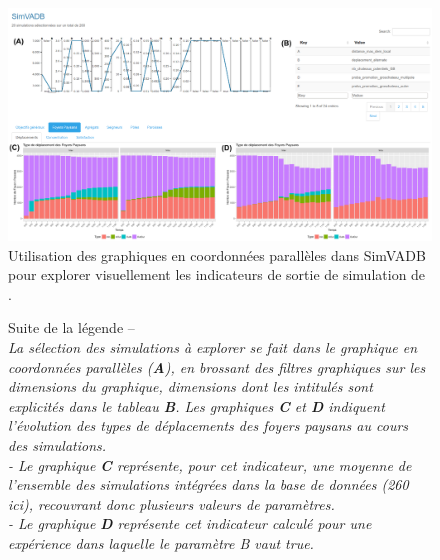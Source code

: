 \begin{figure}[H]
	\centering
	\captionsetup{width=\linewidth}
	\includegraphics[height=.88\linewidth,angle=90]{img/SimVADB_Dashboard2_annote_retouche.png}
	\caption[Utilisation des graphiques en coordonnées parallèles dans SimVADB pour explorer visuellement les indicateurs de sortie de simulation de \simfeodal{}.]{Utilisation des graphiques en coordonnées parallèles dans SimVADB pour explorer visuellement les indicateurs de sortie de simulation de \simfeodal{}.}
	\label{fig:simvadb_dashboard}
\end{figure}
\clearpage

\addtocounter{figure}{-1}
\begin{figure}[H]
	\vspace*{2em}\caption[exemple]{Suite de la légende --\\
\textit{La sélection des simulations à explorer se fait dans le graphique en coordonnées parallèles (\textbf{A}), en \og brossant\fg{} des filtres graphiques sur les \og dimensions\fg{} du graphique, dimensions dont les intitulés sont explicités dans le tableau \textbf{B}.	Les graphiques \textbf{C} et \textbf{D} indiquent l'évolution des types de déplacements des foyers paysans au cours des simulations.\\
- Le graphique \textbf{C} représente, pour cet indicateur, une moyenne de l'ensemble des simulations intégrées dans la base de données (260 ici), recouvrant donc plusieurs valeurs de paramètres.\\
- Le graphique \textbf{D} représente cet indicateur calculé pour une expérience dans laquelle le paramètre \og \textsf{B} \fg{} vaut \textsf{true}.}	
}
\end{figure}

